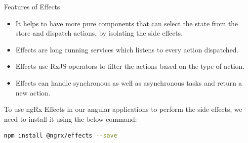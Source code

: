 \documentclass{report}
\begin{document}
Features of Effects
\begin{itemize}
	\item{It helps to have more pure components that can select the state from the store and dispatch actions, by isolating the side effects.}
	\item{Effects are long running services which listens to every action dispatched.}
	\item{Effects use RxJS operators to filter the actions based on the type of action.}
	\item{Effects can handle synchronous as well as asynchronous tasks and return a new action.}
\end{itemize}

To use ngRx Effects in our angular applications to perform the side effects, we need to install it using the below command:
\begin{lstlisting}[language=bash]
npm install @ngrx/effects --save
\end{lstlisting}
\end{document}
